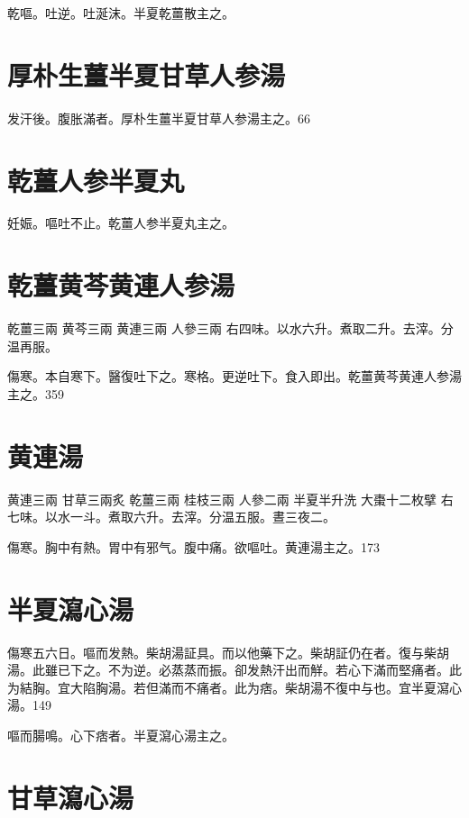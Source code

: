 \documentclass[12pt,twoside,UTF8,b5paper]{ctexbook}
\begin{document}
乾嘔。吐逆。吐涎沫。半夏乾薑散主之。

\section{厚朴生薑半夏甘草人参湯}

发汗後。腹胀滿者。厚朴{生薑半夏甘草人参}湯主之。66

\section{乾薑人参半夏丸}

妊娠。嘔吐不止。乾薑人参半夏丸主之。

\section{乾薑黄芩黄連人参湯}

乾薑{\scriptsize 三兩} 黄芩{\scriptsize 三兩} 黄連{\scriptsize 三兩} 人參{\scriptsize 三兩}
右四味。以水六升。煮取二升。去滓。分温再服。

傷寒。本自寒下。醫復吐{下}之。寒格。更逆吐{下}。食入即出。乾薑黄芩黄連人参湯主之。359

\section{黄連湯}

黄連{\scriptsize 三兩} 甘草{\scriptsize 三兩炙} 乾薑{\scriptsize 三兩} 桂枝{\scriptsize 三兩} 人參{\scriptsize 二兩} 半夏{\scriptsize 半升洗} 大棗{\scriptsize 十二枚擘}
右七味。以水一斗。煮取六升。去滓。分温五服。晝三夜二。

傷寒。胸中有熱。胃中有邪气。腹中痛。欲嘔吐。黄連湯主之。173

\section{半夏瀉心湯}

傷寒五六日。嘔而发熱。柴胡湯証具。而以他藥下之。柴胡証仍在者。復与柴胡湯。此雖已下之。不为逆。必蒸蒸而振。卻发熱汗出而觧。若心下滿而堅痛者。此为結胸。宜大陷胸湯。若但滿而不痛者。此为痞。柴胡{湯}不復中与也。宜半夏瀉心湯。149

嘔而腸鳴。心下痞者。半夏瀉心湯主之。

\section{甘草瀉心湯}
\end{document}
